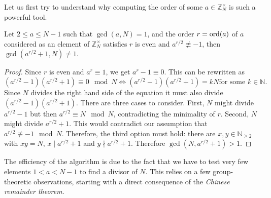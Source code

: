 \documentclass[a4paper, oneside, 12pt]{amsart}
\begin{document}
Let us first try to understand why computing the order of some \(a \in \mathbb{Z}_{N}^{\times}\) is such a powerful tool.

\begin{lemma}\label{lem:finding-divisors-using-gcd-tricks}
  Let \(2\leq a\leq N-1\) such that \(\gcd(a,N)=1\), and the order \(r=\operatorname{ord}(a)\) of \(a\) considered as an element of \( \mathbb{Z}_{N}^{\times}\) satisfies \(r\) is even and \(a^{r/2}\nequiv -1\), then
  \(\gcd(a^{r/2}+1, N)\neq 1\).
\end{lemma}
\begin{proof}
  Since \(r\) is even and \(a^{r}\equiv 1\), we get \(a^{r}-1 \equiv 0\).
  This can be rewritten as
  \begin{equation*}
    (a^{r/2}-1)(a^{r/2}+1) \equiv 0\mod N \iff (a^{r/2}-1)(a^{r/2}+1) = kN \text{for some } k \in \mathbb{N}.
  \end{equation*}
  Since \(N\) divides the right hand side of the equation it must also divide
  \((a^{r/2}-1)(a^{r/2}+1)\).
  There are three cases to consider.
  First, \(N\) might divide \(a^{r/2}-1\) but then \(a^{r/2}\equiv N \mod N\), contradicting the minimality of \(r\).
  Second, \(N\) might divide \(a^{r/2}+1\).
  This would contradict our assumption that  \(a^{r/2}\nequiv -1 \mod N\).
  Therefore, the third option must hold:
  there are \(x,y \in \mathbb{N}_{\geq 2}\) with \(xy =N\), \(x \mid a^{r/2} + 1\) and \(y \nmid a^{r/2}+1 \).
  Therefore \(\gcd(N, a^{r/2}+1) >1\).
\end{proof}

The efficiency of the algorithm is due to the fact that we have to test very few elements \(1<a<N-1\) to find a divisor of \(N\).
This relies on a few group-theoretic observations, starting with a direct consequence of the \emph{Chinese remainder theorem}.
\end{document}

